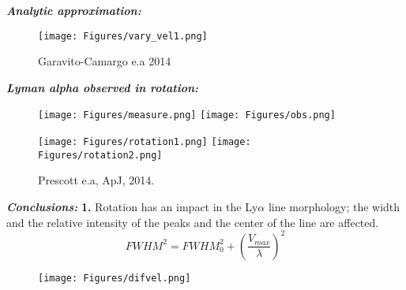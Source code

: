 \documentclass{beamer}
\begin{document}



\begin{frame}{\textit{\textbf{Analytic approximation:}}}
\begin{figure}
\texttt{[image: Figures/vary\_vel1.png]}
\caption*{Garavito-Camargo e.a 2014}
\end{figure}
\end{frame}



\begin{frame}{\textit{\textbf{Lyman alpha observed in rotation:}}}
\begin{figure}
\texttt{[image: Figures/measure.png]}
\texttt{[image: Figures/obs.png]}
\end{figure}
\end{frame}


\begin{frame}
\begin{figure}
\texttt{[image: Figures/rotation1.png]}
\texttt{[image: Figures/rotation2.png]}
\caption*{Prescott e.a, ApJ,  2014.}
\end{figure}
\end{frame}

\begin{frame}{\textit{\textbf{Conclusions:}}}
\textbf{1.} Rotation has an impact in the Ly$\alpha$ line morphology; the width and the relative intensity of the peaks and the center of the line are affected.
\[
FWHM^2 = FWHM_0^2 + \left( \dfrac{V_{max}}{\lambda} \right )^2
\]

\begin{figure}
\texttt{[image: Figures/difvel.png]}
\end{figure}

\end{frame}
\end{document}
